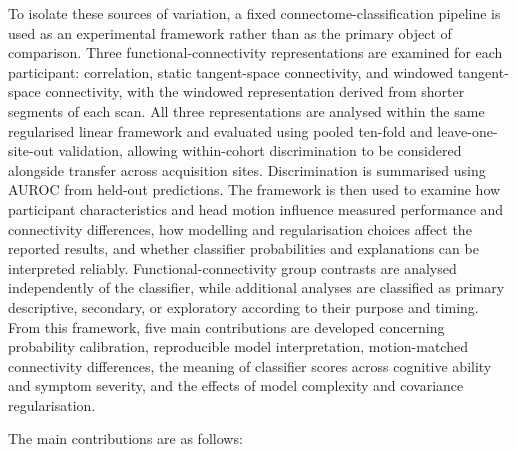 To isolate these sources of variation, a fixed connectome-classification pipeline is used as an experimental framework rather than as the primary object of comparison. Three functional-connectivity representations are examined for each participant: correlation, static tangent-space connectivity, and windowed tangent-space connectivity, with the windowed representation derived from shorter segments of each scan. All three representations are analysed within the same regularised linear framework and evaluated using pooled ten-fold and leave-one-site-out validation, allowing within-cohort discrimination to be considered alongside transfer across acquisition sites. Discrimination is summarised using AUROC from held-out predictions. The framework is then used to examine how participant characteristics and head motion influence measured performance and connectivity differences, how modelling and regularisation choices affect the reported results, and whether classifier probabilities and explanations can be interpreted reliably. Functional-connectivity group contrasts are analysed independently of the classifier, while additional analyses are classified as primary descriptive, secondary, or exploratory according to their purpose and timing. From this framework, five main contributions are developed concerning probability calibration, reproducible model interpretation, motion-matched connectivity differences, the meaning of classifier scores across cognitive ability and symptom severity, and the effects of model complexity and covariance regularisation.

The main contributions are as follows:

